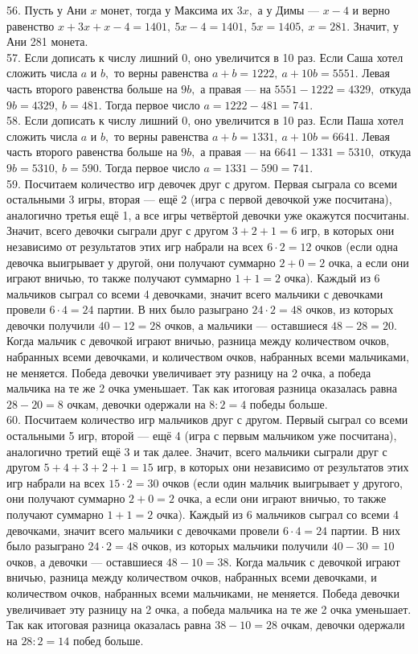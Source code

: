 \documentclass[12pt]{article}
\begin{document}
56. Пусть у Ани $x$ монет, тогда у Максима их $3x,$ а у Димы --- $x-4$ и верно равенство $x+3x+x-4=1401,\ 5x-4=1401,\ 5x=1405,\ x=281.$ Значит, у Ани 281 монета.\\
57. Если дописать к числу лишний 0, оно увеличится в 10 раз. Если Саша хотел сложить числа $a$ и $b,$ то верны равенства $a+b=1222,\ a+10b=5551.$ Левая часть второго равенства больше на $9b,$ а правая --- на $5551-1222=4329,$ откуда $9b=4329,\ b=481.$ Тогда первое число $a=1222-481=741.$\\
58. Если дописать к числу лишний 0, оно увеличится в 10 раз. Если Паша хотел сложить числа $a$ и $b,$ то верны равенства $a+b=1331,\ a+10b=6641.$ Левая часть второго равенства больше на $9b,$ а правая --- на $6641-1331=5310,$ откуда $9b=5310,\ b=590.$ Тогда первое число $a=1331-590=741.$\\
59. Посчитаем количество игр девочек друг с другом. Первая сыграла со всеми остальными 3 игры, вторая --- ещё 2 (игра с первой девочкой уже посчитана), аналогично третья ещё 1, а все игры четвёртой девочки уже окажутся посчитаны. Значит, всего девочки сыграли друг с другом $3+2+1=6$ игр, в которых они независимо от результатов этих игр набрали на всех $6\cdot2=12$ очков (если одна девочка выигрывает у другой, они получают суммарно $2+0=2$ очка, а если они играют вничью, то также получают суммарно $1+1=2$ очка). Каждый из 6 мальчиков сыграл со всеми 4 девочками, значит всего мальчики с девочками провели $6\cdot4=24$ партии. В них было разыграно $24\cdot2=48$ очков, из которых девочки получили $40-12=28$ очков, а мальчики --- оставшиеся $48-28=20.$ Когда мальчик с девочкой играют вничью, разница между количеством очков, набранных всеми девочками, и количеством очков, набранных всеми мальчиками, не меняется. Победа девочки увеличивает эту разницу на 2 очка, а победа мальчика на те же 2 очка уменьшает. Так как итоговая разница оказалась равна $28-20=8$ очкам, девочки одержали на $8:2=4$ победы больше.\\
60. Посчитаем количество игр мальчиков друг с другом. Первый сыграл со всеми остальными 5 игр, второй --- ещё 4 (игра с первым мальчиком уже посчитана), аналогично третий ещё 3 и так далее. Значит, всего мальчики сыграли друг с другом $5+4+3+2+1=15$ игр, в которых они независимо от результатов этих игр набрали на всех $15\cdot2=30$ очков (если один мальчик выигрывает у другого, они получают суммарно $2+0=2$ очка, а если они играют вничью, то также получают суммарно $1+1=2$ очка). Каждый из 6 мальчиков сыграл со всеми 4 девочками, значит всего мальчики с девочками провели $6\cdot4=24$ партии. В них было разыграно $24\cdot2=48$ очков, из которых мальчики получили $40-30=10$ очков, а девочки --- оставшиеся $48-10=38.$ Когда мальчик с девочкой играют вничью, разница между количеством очков, набранных всеми девочками, и количеством очков, набранных всеми мальчиками, не меняется. Победа девочки увеличивает эту разницу на 2 очка, а победа мальчика на те же 2 очка уменьшает. Так как итоговая разница оказалась равна $38-10=28$ очкам, девочки одержали на $28:2=14$ побед больше.\\
\end{document}
